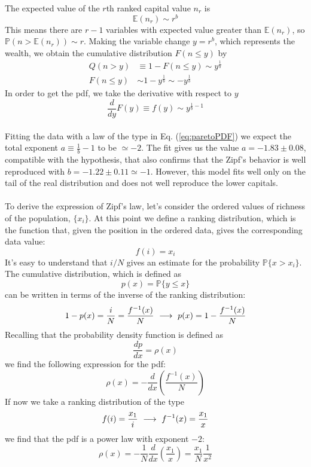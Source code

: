 The expected value of the $r$th ranked capital value $n_r$ is
\begin{equation*}
    \mathbb{E}(n_r)\sim r^b
\end{equation*}
This means there are $r - 1$ variables with expected value greater than $\mathbb{E}(n_r)$, so $\mathbb{P}(n > \mathbb{E}(n_r)) \sim r$.
Making the variable change $y=r^b$, which represents the wealth, we obtain the cumulative distribution $F(n \leq y)$ by
\begin{equation*}
    \begin{split}
        Q(n > y) &\equiv 1 - F(n \leq y) \sim y^{\frac{1}{b}} \\
        F(n \leq y) &\sim 1 - y^{\frac{1}{b}} \sim -y^{\frac{1}{b}}
    \end{split}
\end{equation*}
In order to get the pdf, we take the derivative with respect to $y$
\begin{equation}
    \frac{d}{dy}F(y) \equiv f(y) \sim y^{\frac{1}{b} - 1}
    \label{eq:paretoPDF}
\end{equation}
\\Fitting the data with a law of the type in Eq. (\ref{eq:paretoPDF}) we expect the total exponent $a \equiv \frac{1}{b} - 1$ to be $\simeq -2$.
The fit gives us the value $a = -1.83 \pm 0.08$, compatible with the hypothesis, that also confirms that the Zipf's behavior is well reproduced with $b = -1.22 \pm 0.11 \simeq -1$.
However, this model fits well only on the tail of the real distribution and does not well reproduce the lower capitals. \\ \\
To derive the expression of Zipf's law, let's consider the ordered values of richness of the population, $\{x_i\}$. At this point we define a ranking distribution, which is the function that, given the position in the ordered data, gives the corresponding data value:
\begin{equation}
	f(i) = x_i	
\end{equation}
It's easy to understand that $i/N$ gives an estimate for the probability $\mathbb{P}\{x > x_i\}$. The cumulative distribution, which is defined as
$$
	p(x) = \mathbb{P}\{y \leq x\}
$$
can be written in terms of the inverse of the ranking distribution:
\begin{equation}
	1 - p(x) = \frac{i}{N} = \frac{f^{-1}(x)}{N} \ \longrightarrow \ p(x) = 1 - \frac{f^{-1}(x)}{N}	
\end{equation}
Recalling that the probability density function is defined as 
$$
	\frac{dp}{dx} = \rho(x)
$$
we find the following expression for the pdf:
\begin{equation}
	\rho(x) = -\frac{d}{dx} \left(\frac{f^{-1}(x)}{N}\right)	
\end{equation}
If now we take a ranking distribution of the type
$$
	f(i) = \frac{x_1}{i} \ \longrightarrow \ f^{-1}(x) = \frac{x_1}{x}	
$$
we find that the pdf is a power law with exponent $-2$:
\begin{equation}
	\rho(x) = -\frac{1}{N}\frac{d}{dx}\left(\frac{x_1}{x}\right) = \frac{x_1}{N}\frac{1}{x^2}	
\end{equation}
